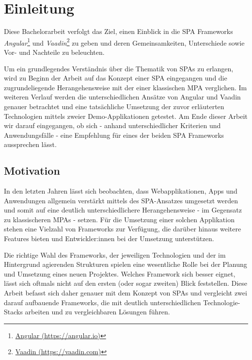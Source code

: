 \documentclass[a4paper,12pt,twoside]{scrreprt}
\begin{document}
\chapter{Einleitung}
\label{chap:einleitung}
Diese Bachelorarbeit verfolgt das Ziel, einen Einblick in die \ac{SPA} Frameworks \textit{Angular}\footnote{\href{https://angular.io/}{Angular (https://angular.io)}} und \textit{Vaadin}\footnote{\href{https://vaadin.com/}{Vaadin (https://vaadin.com)}} zu geben und deren Gemeinsamkeiten, Unterschiede sowie Vor- und Nachteile zu beleuchten.

\medskip

Um ein grundlegendes Verständnis über die Thematik von \aclp{SPA} zu erlangen, wird zu Beginn der Arbeit auf das Konzept einer \ac{SPA} eingegangen und die zugrundeliegende Herangehensweise mit der einer klassischen \ac{MPA} verglichen. Im weiteren Verlauf werden die unterschiedlichen Ansätze von Angular und Vaadin genauer betrachtet und eine tatsächliche Umsetzung der zuvor erläuterten Technologien mittels zweier Demo-Applikationen getestet. Am Ende dieser Arbeit wir darauf eingegangen, ob sich - anhand unterschiedlicher Kriterien und Anwendungsfälle - eine Empfehlung für eines der beiden \acs{SPA} Frameworks aussprechen lässt.

\section{Motivation}
\label{sec:motivation}
In den letzten Jahren lässt sich beobachten, dass Webapplikationen, Apps und Anwendungen allgemein verstärkt mittels des \acs{SPA}-Ansatzes umgesetzt werden und somit auf eine deutlich unterschiedlichere Herangehensweise - im Gegensatz zu klassischeren \aclp{MPA} - setzen. Für die Umsetzung einer solchen Applikation stehen eine Vielzahl von Frameworks zur Verfügung, die darüber hinaus weitere Features bieten und Entwickler:innen bei der Umsetzung unterstützen.

\newpage

Die richtige Wahl des Frameworks, der jeweiligen Technologien und der im Hintergrund agierenden Strukturen spielen eine wesentliche Rolle bei der Planung und Umsetzung eines neuen Projektes. Welches Framework sich besser eignet, lässt sich oftmals nicht auf den ersten (oder sogar zweiten) Blick feststellen. Diese Arbeit befasst sich daher genauer mit dem Konzept von \aclp{SPA} und vergleicht zwei darauf aufbauende Frameworks, die mit deutlich unterschiedlichen Technologie-Stacks arbeiten und zu vergleichbaren Lösungen führen.
\end{document}
